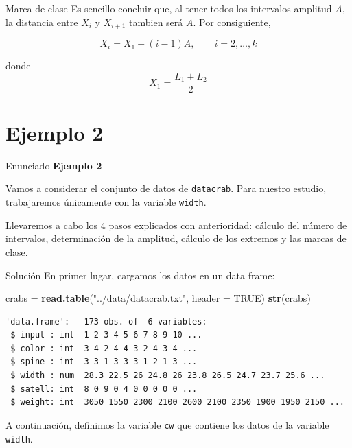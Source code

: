 \documentclass[
  ignorenonframetext,
]{beamer}
\newenvironment{Shaded}{\begin{snugshade}}{\end{snugshade}}
\newcommand{\AttributeTok}[1]{\textcolor[rgb]{0.13,0.29,0.53}{#1}}
\newcommand{\ConstantTok}[1]{\textcolor[rgb]{0.56,0.35,0.01}{#1}}
\newcommand{\FunctionTok}[1]{\textcolor[rgb]{0.13,0.29,0.53}{\textbf{#1}}}
\newcommand{\NormalTok}[1]{#1}
\newcommand{\OtherTok}[1]{\textcolor[rgb]{0.56,0.35,0.01}{#1}}
\newcommand{\SpecialCharTok}[1]{\textcolor[rgb]{0.81,0.36,0.00}{\textbf{#1}}}
\newcommand{\StringTok}[1]{\textcolor[rgb]{0.31,0.60,0.02}{#1}}
\begin{document}
\begin{frame}{Marca de clase}
\label{marca-de-clase-1}
Es sencillo concluir que, al tener todos los intervalos amplitud \(A\),
la distancia entre \(X_i\) y \(X_{i+1}\) tambien será \(A\). Por
consiguiente,

\[X_{i} = X_1+ (i-1)A,\qquad i=2,\dots,k\]

donde \[X_1 = \frac{L_1+L_2}{2}\]
\end{frame}

\section{Ejemplo 2}\label{ejemplo-2-9}

\begin{frame}[fragile]{Enunciado}
\label{enunciado}
\textbf{Ejemplo 2}

Vamos a considerar el conjunto de datos de \texttt{datacrab}. Para
nuestro estudio, trabajaremos únicamente con la variable \texttt{width}.

Llevaremos a cabo los 4 pasos explicados con anterioridad: cálculo del
número de intervalos, determinación de la amplitud, cálculo de los
extremos y las marcas de clase.
\end{frame}

\begin{frame}[fragile]{Solución}
\label{soluciuxf3n}
En primer lugar, cargamos los datos en un data frame:

\begin{Shaded}
\begin{Highlighting}[]
\NormalTok{crabs }\OtherTok{=} \FunctionTok{read.table}\NormalTok{(}\StringTok{"../data/datacrab.txt"}\NormalTok{, }\AttributeTok{header =} \ConstantTok{TRUE}\NormalTok{)}
\FunctionTok{str}\NormalTok{(crabs)}
\end{Highlighting}
\end{Shaded}

\begin{verbatim}
'data.frame':   173 obs. of  6 variables:
 $ input : int  1 2 3 4 5 6 7 8 9 10 ...
 $ color : int  3 4 2 4 4 3 2 4 3 4 ...
 $ spine : int  3 3 1 3 3 3 1 2 1 3 ...
 $ width : num  28.3 22.5 26 24.8 26 23.8 26.5 24.7 23.7 25.6 ...
 $ satell: int  8 0 9 0 4 0 0 0 0 0 ...
 $ weight: int  3050 1550 2300 2100 2600 2100 2350 1900 1950 2150 ...
\end{verbatim}

\begin{Shaded}
\end{Shaded}

A continuación, definimos la variable \texttt{cw} que contiene los datos
de la variable \texttt{width}.
\end{frame}
\end{document}
